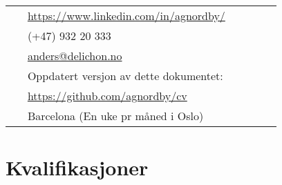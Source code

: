 \documentclass[10pt]{article} %
\begin{document}
\begin{paracol}{2}

\parbox[top][0.12\textheight][c]{\linewidth}{ %
	\vspace{-0.04\textheight} %
	\colorbox{shade}{ %
		\begin{supertabular}{p{0.05\linewidth}|p{0.775\linewidth}} %
			\raisebox{-1pt}{\faLinkedinSquare} & \href{https://www.linkedin.com/in/agnordby/}{https://www.linkedin.com/in/agnordby/} \\ %
			\raisebox{-1pt}{\faPhone} & (+47) 932 20 333 \\ %
			\raisebox{0pt}{\small\faEnvelope} & \href{mailto:anders@delichon.no}{anders@delichon.no} \\ %
			\raisebox{-1pt}{\faGithub} & Oppdatert versjon av dette dokumentet: \\ %
			\raisebox{-1pt}{} & \href{https://https://github.com/agnordby/cv}{https://github.com/agnordby/cv} \\ %
			\raisebox{-1pt}{\faHome} & Barcelona (En uke pr måned i Oslo) \\ %
		\end{supertabular}
	}
}


\section{Kvalifikasjoner}





\end{paracol}
\end{document}
